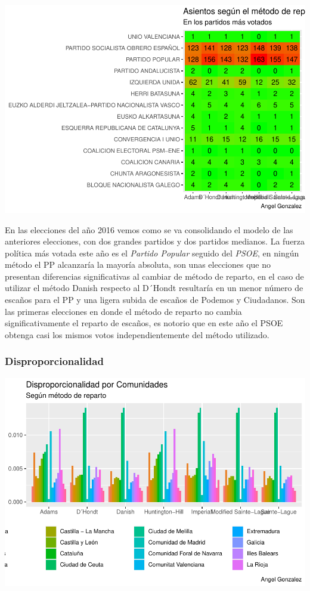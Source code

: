 \documentclass[12pt,a4paper,]{book}
\numberwithin{dummy}{section}
\theoremstyle{ocrenumbox}
\theoremstyle{blacknumex}
\theoremstyle{blacknumbox}
\theoremstyle{ocrenum}
\theoremstyle{ocrenum}
\begin{document}
\begin{center}\includegraphics[width=0.95\linewidth]{figurasR/unnamed-chunk-119-2} \end{center}

En las elecciones del año 2016 vemos como se va consolidando el modelo
de las anteriores elecciones, con dos grandes partidos y dos partidos
medianos. La fuerza política más votada este año es el \emph{Partido
Popular} seguido del \emph{PSOE}, en ningún método el PP alcanzaría la
mayoría absoluta, son unas elecciones que no presentan diferencias
significativas al cambiar de método de reparto, en el caso de utilizar
el método Danish respecto al D´Hondt resultaría en un menor número de
escaños para el PP y una ligera subida de escaños de Podemos y
Ciudadanos. Son las primeras elecciones en donde el método de reparto no
cambia significativamente el reparto de escaños, es notorio que en este
año el PSOE obtenga casi los mismos votos independientemente del método
utilizado.

\hypertarget{disproporcionalidad-11}{%
\subsubsection{Disproporcionalidad}\label{disproporcionalidad-11}}

\begin{center}\includegraphics[width=0.95\linewidth]{figurasR/unnamed-chunk-120-1} \end{center}
\end{document}
